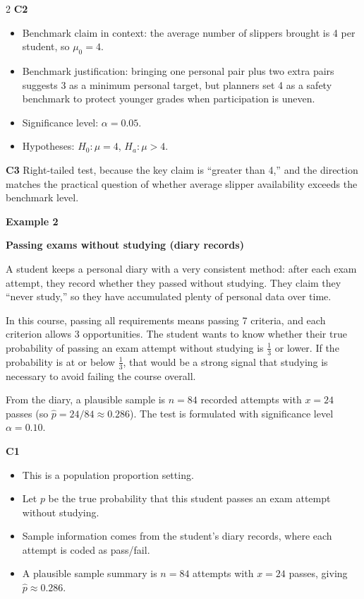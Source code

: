 \documentclass[12pt]{article}
\newcommand{\SubsectionBox}[1]{%
\noindent\colorbox{gray!30}{%
\parbox{\linewidth}{\textbf{#1}}%
}\par\vspace{0.35cm}%
}
\begin{document}
\begin{multicols}{2}
\textbf{C2}
\begin{itemize}
\item Benchmark claim in context: the average number of slippers brought is 4 per student, so \(\mu_0=4\).
\item Benchmark justification: bringing one personal pair plus two extra pairs suggests 3 as a minimum personal target, but planners set 4 as a safety benchmark to protect younger grades when participation is uneven.
\item Significance level: \(\alpha=0.05\).
\item Hypotheses: \(H_0\colon \mu=4\), \(H_a\colon \mu>4\).
\end{itemize}

\textbf{C3}
Right-tailed test, because the key claim is ``greater than 4,'' and the direction matches the practical question of whether average slipper availability exceeds the benchmark level.

\vspace{0.25cm}
\SubsectionBox{Example 2}\vspace{-0.25cm}

\textbf{Passing exams without studying (diary records)}

A student keeps a personal diary with a very consistent method: after each exam attempt, they record whether they passed without studying. They claim they ``never study,'' so they have accumulated plenty of personal data over time.

In this course, passing all requirements means passing 7 criteria, and each criterion allows 3 opportunities. The student wants to know whether their true probability of passing an exam attempt without studying is \(\frac{1}{3}\) or lower. If the probability is at or below \(\frac{1}{3}\), that would be a strong signal that studying is necessary to avoid failing the course overall.

From the diary, a plausible sample is \(n=84\) recorded attempts with \(x=24\) passes (so \(\hat{p}=24/84\approx0.286\)). The test is formulated with significance level \(\alpha=0.10\).

\textbf{C1}
\begin{itemize}
\item This is a population proportion setting.
\item Let \(p\) be the true probability that this student passes an exam attempt without studying.
\item Sample information comes from the student's diary records, where each attempt is coded as pass/fail.
\item A plausible sample summary is \(n=84\) attempts with \(x=24\) passes, giving \(\hat{p}\approx0.286\).
\end{itemize}


\end{multicols}
\end{document}
